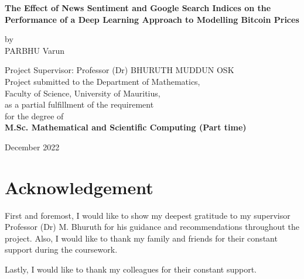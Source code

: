 \documentclass[a4paper,12pt,hidelinks]{report}
\begin{document}
\begin{titlepage}
\begin{center}
\begin{huge}
\textbf{The Effect of News Sentiment and Google Search Indices on the Performance of a Deep Learning Approach to Modelling Bitcoin Prices}\\
\end{huge}
\vspace{10mm}
\begin{huge}
by \\
PARBHU Varun \\ 
\end{huge}
\begin{large}
\vspace{15mm}
Project Supervisor: Professor (Dr) BHURUTH MUDDUN OSK \\
\vspace{15mm}
Project submitted to the Department of Mathematics,\\
Faculty of Science, University of Mauritius,\\
as a partial fulfillment of the requirement\\
for the degree of\\
\textbf{M.Sc. Mathematical and Scientific Computing (Part time)}\\
\end{large}
\vspace{30mm}
December 2022
\end{center}
\end{titlepage}
\tableofcontents


\listoffigures
{}

\listoftables
{}

\chapter*{Acknowledgement}
First and foremost, I would like to show my deepest gratitude to my supervisor Professor (Dr) M. Bhuruth for his guidance and recommendations throughout the project. Also, I would like to thank my family and friends for their constant support during the coursework.

\noindent Lastly, I would like to thank my colleagues for their constant support.
\end{document}
